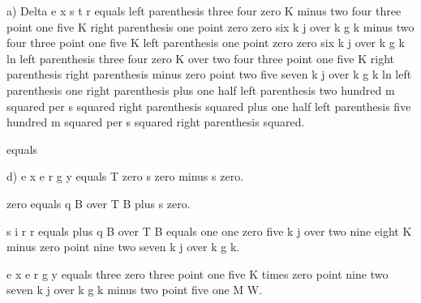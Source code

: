 a) Delta e x s t r equals left parenthesis three four zero K minus two four three point one five K right parenthesis one point zero zero six k j over k g k minus two four three point one five K left parenthesis one point zero zero six k j over k g k ln left parenthesis three four zero K over two four three point one five K right parenthesis right parenthesis minus zero point two five seven k j over k g k ln left parenthesis one right parenthesis plus one half left parenthesis two hundred m squared per s squared right parenthesis squared plus one half left parenthesis five hundred m squared per s squared right parenthesis squared.

equals

d) e x e r g y equals T zero s zero minus s zero.

zero equals q B over T B plus s zero.

s i r r equals plus q B over T B equals one one zero five k j over two nine eight K minus zero point nine two seven k j over k g k.

e x e r g y equals three zero three point one five K times zero point nine two seven k j over k g k minus two point five one M W.